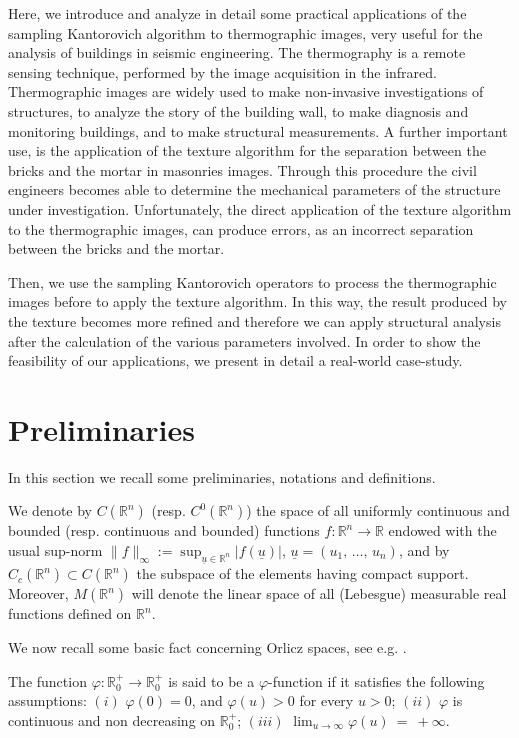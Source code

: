 \documentclass[11pt,a4paper]{article}
\newcommand{\R}{\mathbb{R}}
\newcommand{\uu}{\underline{u}}
\begin{document}
  Here, we introduce and analyze in detail some practical applications of the sampling Kantorovich algorithm to thermographic images, very useful for the analysis of buildings in seismic engineering. The thermography is a remote sensing technique, performed by the image acquisition in the infrared. Thermographic images are widely used to make non-invasive investigations of structures, to analyze the story of the building wall, to make diagnosis and monitoring buildings, and to make structural measurements. A further important use, is the application of the texture algorithm for the separation between the bricks and the mortar in masonries images. Through this procedure the civil engineers becomes able to determine the mechanical parameters of the structure under investigation. Unfortunately, the direct application of the texture algorithm to the thermographic images, can produce errors, as an incorrect separation between the bricks and the mortar. 

  Then, we use the sampling Kantorovich operators to process the thermographic images before to apply the texture algorithm. In this way, the result produced by the texture becomes more refined and therefore we can apply structural analysis after the calculation of the various parameters involved. In order to show the feasibility of our applications, we present in detail a real-world case-study.


\section{Preliminaries}

In this section we recall some preliminaries, notations and definitions.

  We denote by $C(\R^n)$ (resp. $C^0(\R^n)$) the space of all uniformly continuous and bounded (resp. continuous and bounded) functions $f:\R^n\to \R$ endowed with the usual sup-norm $\|f\|_{\infty} := \sup_{\uu \in \R^n}\left|f(\uu)\right|$, $\uu = (u_1,\, \dots,\, u_n)$, and by $C_c(\R^n) \subset C(\R^n)$ the subspace of the elements having compact support. Moreover, $M\left(\R^n\right)$ will denote the linear space of all (Lebesgue) measurable real functions defined on $\R^n$.

   We now recall some basic fact concerning Orlicz spaces, see e.g. \cite{MUORL,MU1,RAO1,BAVI_1,BAMUVI}.  

\noindent   The function $\varphi: \R^+_0 \to \R^+_0$ is said to be a $\varphi$-function if it satisfies the following assumptions: $(i)$ $\varphi \left(0\right)=0$, and $\varphi \left(u\right)>0$ for every $u>0$; $(ii)$ $\varphi$ is continuous and non decreasing on $\R^+_0$; $(iii)$
$\lim_{u\to \infty}\varphi(u)\ =\ + \infty$.
%
\end{document}
